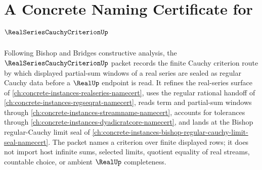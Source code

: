 \chapter{A Concrete Naming Certificate for $\RealSeriesCauchyCriterionUp$}
\label{ch:concrete-instances-real-series-cauchy-criterion-namecert}

Following Bishop and Bridges constructive analysis, the $\RealSeriesCauchyCriterionUp$ packet records the finite Cauchy criterion route by which displayed partial-sum windows of a real series are sealed as regular Cauchy data before a $\RealUp$ endpoint is read. It refines the real-series surface of \autoref{ch:concrete-instances-realseries-namecert}, uses the regular rational handoff of \autoref{ch:concrete-instances-regseqrat-namecert}, reads term and partial-sum windows through \autoref{ch:concrete-instances-streamname-namecert}, accounts for tolerances through \autoref{ch:concrete-instances-dyadicratcore-namecert}, and lands at the Bishop regular-Cauchy limit seal of \autoref{ch:concrete-instances-bishop-regular-cauchy-limit-seal-namecert}. The packet names a criterion over finite displayed rows; it does not import host infinite sums, selected limits, quotient equality of real streams, countable choice, or ambient $\RealUp$ completeness.

